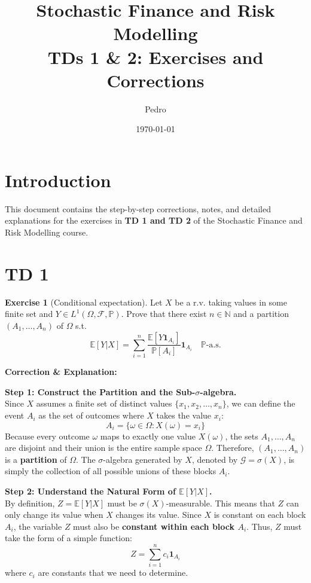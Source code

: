 \documentclass[12pt, a4paper]{article}
\title{\textbf{Stochastic Finance and Risk Modelling} \\ \large TDs 1 \& 2: Exercises and Corrections}
\author{Pedro}
\date{\today}
\theoremstyle{definition}
\newtheorem{exercise}{Exercise}
\begin{document}
\maketitle

\tableofcontents

\vspace{1cm}

\section*{Introduction}
This document contains the step-by-step corrections, notes, and detailed explanations for the exercises in \textbf{TD 1 and TD 2} of the Stochastic Finance and Risk Modelling course.

\section{TD 1}

\begin{exercise}[Conditional expectation]
Let $X$ be a r.v. taking values in some finite set and $Y \in L^1(\Omega, \mathcal{F}, \mathbb{P})$. Prove that there exist $n \in \mathbb{N}$ and a partition $(A_1, \dots, A_n)$ of $\Omega$ s.t.
\[
\mathbb{E}[Y|X] = \sum_{i=1}^n \frac{\mathbb{E}[Y \mathbf{1}_{A_i}]}{\mathbb{P}[A_i]}\mathbf{1}_{A_i} \quad \mathbb{P}\text{-a.s.}
\]
\end{exercise}

\textbf{Correction \& Explanation:}

\textbf{Step 1: Construct the Partition and the Sub-$\sigma$-algebra.} \\
Since $X$ assumes a finite set of distinct values $\{x_1, x_2, \dots, x_n\}$, we can define the event $A_i$ as the set of outcomes where $X$ takes the value $x_i$:
\[ A_i = \{\omega \in \Omega : X(\omega) = x_i\} \]
Because every outcome $\omega$ maps to exactly one value $X(\omega)$, the sets $A_1, \dots, A_n$ are disjoint and their union is the entire sample space $\Omega$. Therefore, $(A_1, \dots, A_n)$ is a \textbf{partition} of $\Omega$.
The $\sigma$-algebra generated by $X$, denoted by $\mathcal{G} = \sigma(X)$, is simply the collection of all possible unions of these blocks $A_i$.

\textbf{Step 2: Understand the Natural Form of $\mathbb{E}[Y|X]$.} \\
By definition, $Z = \mathbb{E}[Y|X]$ must be $\sigma(X)$-measurable. This means that $Z$ can only change its value when $X$ changes its value. Since $X$ is constant on each block $A_i$, the variable $Z$ must also be \textbf{constant within each block $A_i$}. 
Thus, $Z$ must take the form of a simple function:
\[ Z = \sum_{i=1}^n c_i \mathbf{1}_{A_i} \]
where $c_i$ are constants that we need to determine.
\end{document}
